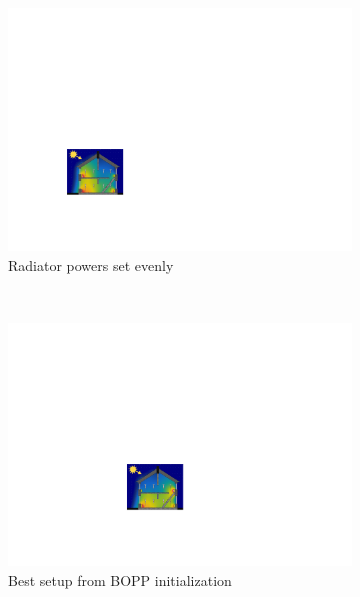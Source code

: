 \begin{figure}[t]
	\centering
	\begin{subfigure}[t]{0.47\textwidth}
		\includegraphics[width=\textwidth]{house-heating/even_powers.pdf}
		\caption{Radiator powers set evenly}
	\end{subfigure}
	~~~~ %
		\begin{subfigure}[t]{0.47\textwidth}
			\includegraphics[width=\textwidth]{house-heating/first_iter.pdf}
			\caption{Best setup from BOPP initialization}
		\end{subfigure} \\
		\vspace{10pt}
			\begin{subfigure}[t]{0.47\textwidth}

\end{subfigure}
\end{figure}
